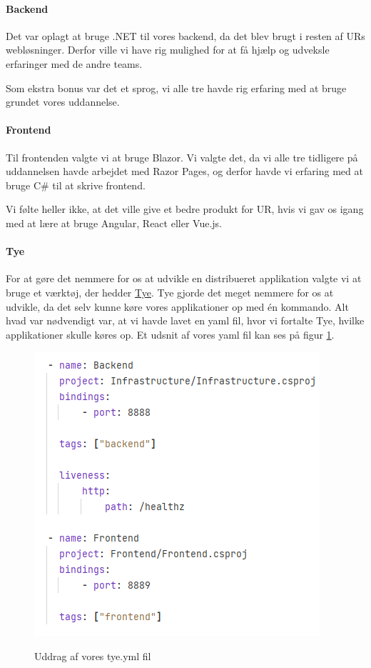 \documentclass[a4paper]{article}
\begin{document}
\paragraph{Backend}
Det var oplagt at bruge .NET til vores backend,
da det blev brugt i resten af URs webløsninger.
Derfor ville vi have rig mulighed for at få hjælp
og udveksle erfaringer med de andre teams.

Som ekstra bonus var det et sprog, 
vi alle tre havde rig erfaring med at bruge grundet vores uddannelse.

\paragraph{Frontend}
Til frontenden valgte vi at bruge Blazor.
Vi valgte det,
da vi alle tre tidligere på uddannelsen havde arbejdet med Razor Pages,
og derfor havde vi erfaring med at bruge C\# til at skrive frontend.

Vi følte heller ikke, at det ville give et bedre produkt for UR,
hvis vi gav os igang med at lære at bruge Angular, React eller Vue.js.

\paragraph{Tye}
For at gøre det nemmere for os at udvikle en distribueret applikation
valgte vi at bruge et værktøj, der hedder
\href{https://github.com/dotnet/tye}{Tye}.
Tye gjorde det meget nemmere for os at udvikle,
da det selv kunne køre vores applikationer op med én kommando.
Alt hvad var nødvendigt var,
at vi havde lavet en yaml fil,
hvor vi fortalte Tye,
hvilke applikationer skulle køres op.
Et udsnit af vores yaml fil kan ses på figur \ref{tye}.

\begin{figure}[ht!]
    \includegraphics[scale=0.7]{tye.png}
    \centering
    \label{tye}
    \caption{Uddrag af vores tye.yml fil}
\end{figure}
\end{document}

